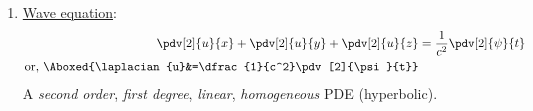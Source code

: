\begin{enumerate}
            \item \ul{Wave equation}:
            \begin{align*}
                \pdv[2]{u}{x}+\pdv[2]{u}{y}+\pdv[2]{u}{z}&=\dfrac{1}{c^2}\pdv[2]{\psi}{t} \\
                \text{or, }\Aboxed{\laplacian{u}&=\dfrac{1}{c^2}\pdv[2]{\psi}{t}}
            \end{align*}
            A \textit{second order}, \textit{first degree}, \textit{linear}, \textit{homogeneous} PDE (hyperbolic).
        \end{enumerate}